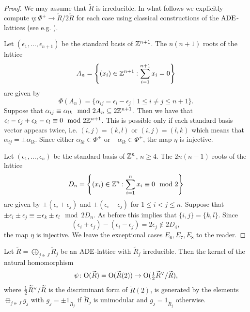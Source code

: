 \documentclass{amsart}
\numberwithin{procedure}{section}
\newcommand{\rl}{R}
\newcommand{\trl}{\widetilde{\rl}}
\begin{document}
\begin{proof}
 We may assume that $\trl$ is irreducible. 
 In what follows we explicitly compute $\eta\colon \Phi^+ \rightarrow\trl/2\trl$ 
 for each case using 
 classical constructions
 of the $\mathord{\rm ADE}$-lattices (see e.g. \cite[Theorem 1.2]{ebeling:lattices-and-codes}).
\par
 Let $(\epsilon_1, \dots, \epsilon_{n+1})$ be the standard basis of $\mathord{\mathbb Z}^{n+1}$.
 The $n(n+1)$ roots of the lattice
 \[A_n = \left\{(x_i) \in \mathord{\mathbb Z}^{n+1} : \sum_{i=1}^{n+1} x_i = 0 \right\}\]
 are given by
 \[\Phi(A_n)=\{\alpha_{ij}=\epsilon_i - \epsilon_j \mid 1\leq i \neq j \leq n+1\}.\]
 Suppose that $\alpha_{ij}\equiv \alpha_{lk} \mod 2A_n\subseteq 2\mathord{\mathbb Z}^{n+1}$.
 Then
  we have that $\epsilon_i - \epsilon_j +\epsilon_k - \epsilon_l \equiv 0 \mod 2\mathord{\mathbb Z}^{n+1}$.
 This is possible only if each standard basis vector appears twice, i.e. $(i,j)=(k,l)$ or $(i,j)=(l,k)$ which means that
 $\alpha_{ij} = \pm \alpha_{lk}$. 
 Since either $\alpha_{lk}\in \Phi^+$ or $-\alpha_{lk} \in \Phi^+$, the map $\eta$ is injective.
\par
 Let $(\epsilon_1, \dots, \epsilon_{n})$ be the standard basis of $\mathord{\mathbb Z}^{n}$, $n\geq 4$.
 The $2n(n-1)$ roots of  the lattice
 \[D_n = \left\{(x_i) \in \mathord{\mathbb Z}^{n} : \sum_{i=1}^n x_i \equiv 0 \mod 2 \right\}\]
 are given by
 $\pm (\epsilon_i + \epsilon_j)$ and $\pm (\epsilon_i -  \epsilon_j)$ for $1\leq i < j \leq n$.
 Suppose that $\pm \epsilon_i \pm \epsilon_j \equiv \pm \epsilon_k \pm \epsilon_l \mod 2D_n$.
 As before this implies that $\{i,j\} = \{k,l\}$.
 Since \[(\epsilon_i + \epsilon_j)- (\epsilon_i - \epsilon_j)=2\epsilon_j \notin 2D_4,\]
 the map $\eta$ is injective.
We leave the exceptional cases $E_6,E_7,E_8$ to the reader.
\end{proof}
%
\begin{lemma}\label{lem:imGm}
Let $\trl=\bigoplus_{j \in J} \trl_j$ be  an $\mathord{\rm ADE}$-lattice with $\trl_j$ irreducible.
Then the kernel of the natural homomorphism
\[
\psi \colon \OG(\trl)=\OG(\trl(2)) \rightarrow \OG(\tfrac{1}{2}\trl\dual /\trl),
\]
where  $\tfrac{1}{2}\trl\dual /\trl$ is the discriminant form of $\trl(2)$,
is generated by the elements $\oplus_{j\in J} g_j$ with $g_j = \pm 1_{\trl_j}$
 if $\trl_j$ is unimodular and $g_j = 1_{\trl_j}$  otherwise.
\end{lemma}
%
\end{document}
